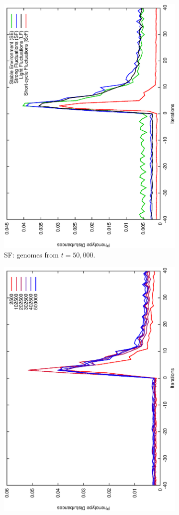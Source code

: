 \begin{figure}[h]
\begin{subfigure}{.25\textwidth}
 \centering
 \includegraphics[width=.7\linewidth, angle =-90]{img/Sucavg499999variationb.eps}
 \caption{SF: genomes from $t\!=\!50,000$.}
 \label{fig:transst}
\end{subfigure}%
\begin{subfigure}{.25\textwidth}
 \centering
 \includegraphics[width=.7\linewidth, angle =-90]{img/SucavgvarValidvariationb.eps}

\end{subfigure}
\end{figure}
